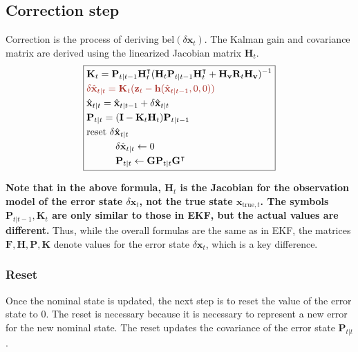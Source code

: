 \documentclass[10pt]{article}
\begin{document}
	\subsection{Correction step}
	Correction is the process of deriving $\text{bel}(\delta \mathbf{x}_{t})$. The Kalman gain and covariance matrix are derived using the linearized Jacobian matrix $\mathbf{H}_{t}$.
	\begin{equation} 
	\boxed { \begin{aligned}
			&     \mathbf{K}_{t} = \mathbf{P}_{t|t-1}\mathbf{H}_{t}^{\intercal}(\mathbf{H}_{t}\mathbf{P}_{t|t-1}\mathbf{H}_{t}^{\intercal} + \mathbf{H}_{\mathbf{v}} \mathbf{R}_{t} \mathbf{H}_{\mathbf{v}})^{-1} \\
			& {\color{Mahogany} \delta \hat{\mathbf{x}}_{t|t} = \mathbf{K}_{t}( \mathbf{z}_{t} - \mathbf{h}(\hat{\mathbf{x}}_{t|t-1}, 0,0)) } \\ 
			& \hat{\mathbf{x}}_{t|t}  = \hat{\mathbf{x}}_{t|t-1} +  \delta \hat{\mathbf{x}}_{t|t} \\
			&     \mathbf{P}_{t|t}    = (\mathbf{I} - \mathbf{K}_{t}\mathbf{H}_{t})\mathbf{P}_{t|t-1} \\
			& \text{reset } \delta \hat{\mathbf{x}}_{t|t}  \\
			& \quad \quad \quad \delta \hat{\mathbf{x}}_{t|t} \leftarrow 0 \\
			&  \quad \quad \quad \mathbf{P}_{t|t} \leftarrow \mathbf{G}\mathbf{P}_{t|t}\mathbf{G}^{\intercal}
	\end{aligned} } \label{eq:eskf1}
	\end{equation}
	
	\textbf{Note that in the above formula, $\mathbf{H}_{t}$ is the Jacobian for the observation model of the error state $\delta \mathbf{x}_{t}$, not the true state $\mathbf{x}_{\text{true},t}$. The symbols $\mathbf{P}_{t|t-1}, \mathbf{K}_{t}$ are only similar to those in EKF, but the actual values are different.} Thus, while the overall formulas are the same as in EKF, the matrices $\mathbf{F},\mathbf{H},\mathbf{P},\mathbf{K}$ denote values for the error state $\delta \mathbf{x}_{t}$, which is a key difference.
	
	\subsubsection{Reset}
	Once the nominal state is updated, the next step is to reset the value of the error state to 0. The reset is necessary because it is necessary to represent a new error for the new nominal state. The reset updates the covariance of the error state $\mathbf{P}_{t|t}$.
	
\end{document}
